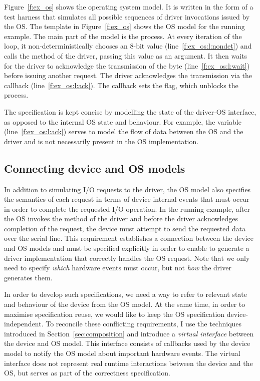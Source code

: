 Figure~\ref{f:ex_os} shows the operating system model. It is written in the form of a test harness that simulates all possible sequences of driver invocations issued by the OS\@.  The  template in Figure~\ref{f:ex_os} shows the OS model for the running example.  The main part of the model is the  process.  At every iteration of the loop, it non-deterministically chooses an 8-bit value (line~\ref{f:ex_os:l:nondet}) and calls the  method of the driver, passing this value as an argument.  It then waits for the driver to acknowledge the transmission of the byte (line~\ref{f:ex_os:l:wait}) before issuing another request.  The driver acknowledges the transmission via the  callback (line~\ref{f:ex_os:l:ack}).  The callback sets the  flag, which unblocks the  process.

The specification is kept concise by modelling the state of the driver-OS interface, as opposed to the internal OS state and behaviour.  For example, the  variable (line~\ref{f:ex_os:l:ack}) serves to model the flow of data between the OS and the driver and is not necessarily present in the OS implementation.

\subsection{Connecting device and OS models}
\label{s:virt}

In addition to simulating I/O requests to the driver, the OS model also specifies the semantics of each request in terms of device-internal events that must occur in order to complete the requested I/O operation.  In the running example, after the OS invokes the  method of the driver and before the driver acknowledges completion of the request, the device must attempt to send the requested data over the serial line.  This requirement establishes a connection between the device and OS models and must be specified explicitly in order to enable \termite to generate a driver implementation that correctly handles the OS request.  Note that we only need to specify \emph{which} hardware events must occur, but not \emph{how} the driver generates them.

In order to develop such specifications, we need a way to refer to relevant state and behaviour of the device from the OS model.  At the same time, in order to maximise specification reuse, we would like to keep the OS specification device-independent.  To reconcile these conflicting requirements, I use the techniques introduced in Section~\ref{sec:composition} and introduce a \emph{virtual interface} between the device and OS model.  This interface consists of callbacks used by the device model to notify the OS model about important hardware events.  The virtual interface does not represent real runtime interactions between the device and the OS, but serves as part of the correctness specification. 

